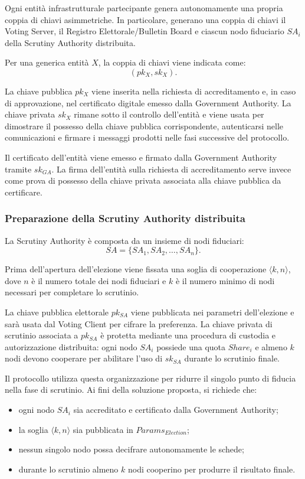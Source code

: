 \documentclass[a4paper,12pt]{article}
\begin{document}
Ogni entit\`a infrastrutturale partecipante genera autonomamente una propria coppia di chiavi asimmetriche. 
In particolare, generano una coppia di chiavi il Voting Server, il Registro Elettorale/Bulletin Board e ciascun nodo fiduciario \(SA_i\) della Scrutiny Authority distribuita.

Per una generica entit\`a \(X\), la coppia di chiavi viene indicata come:
\[
	(pk_X, sk_X).
\]

La chiave pubblica \(pk_X\) viene inserita nella richiesta di accreditamento e, in caso di approvazione, nel certificato digitale emesso dalla Government Authority. 
La chiave privata \(sk_X\) rimane sotto il controllo dell'entit\`a e viene usata per dimostrare il possesso della chiave pubblica corrispondente, autenticarsi nelle comunicazioni e firmare i messaggi prodotti nelle fasi successive del protocollo.

Il certificato dell'entit\`a viene emesso e firmato dalla Government Authority tramite \(sk_{GA}\). 
La firma dell'entit\`a sulla richiesta di accreditamento serve invece come prova di possesso della chiave privata associata alla chiave pubblica da certificare.

\subsubsection{Preparazione della Scrutiny Authority distribuita}

La Scrutiny Authority \`e composta da un insieme di nodi fiduciari:
\[
	SA = \{SA_1, SA_2, \dots, SA_n\}.
\]

Prima dell'apertura dell'elezione viene fissata una soglia di cooperazione \(\langle k,n\rangle\), dove \(n\) \`e il numero totale dei nodi fiduciari e \(k\) \`e il numero minimo di nodi necessari per completare lo scrutinio.

La chiave pubblica elettorale \(pk_{SA}\) viene pubblicata nei parametri dell'elezione e sar\`a usata dal Voting Client per cifrare la preferenza. 
La chiave privata di scrutinio associata a \(pk_{SA}\) \`e protetta mediante una procedura di custodia e autorizzazione distribuita: ogni nodo \(SA_i\) possiede una quota \(Share_i\) e almeno \(k\) nodi devono cooperare per abilitare l'uso di \(sk_{SA}\) durante lo scrutinio finale.

Il protocollo utilizza questa organizzazione per ridurre il singolo punto di fiducia nella fase di scrutinio. 
Ai fini della soluzione proposta, si richiede che:

\begin{itemize}
	\item ogni nodo \(SA_i\) sia accreditato e certificato dalla Government Authority;
	\item la soglia \(\langle k,n\rangle\) sia pubblicata in \(Params_{Election}\);
	\item nessun singolo nodo possa decifrare autonomamente le schede;
	\item durante lo scrutinio almeno \(k\) nodi cooperino per produrre il risultato finale.
\end{itemize}
\end{document}
